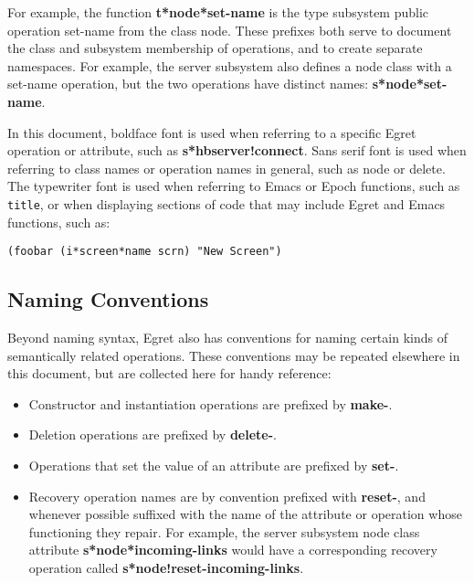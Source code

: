 For example, the function {\bf t*node*set-name} is the type subsystem
public operation {\sf set-name} from the class
{\sf node}.  These prefixes both serve to document the class and
subsystem membership of operations, and to create separate namespaces.
For example, the server subsystem also defines a node class with a
set-name operation, but the two operations have distinct names:
{\bf s*node*set-name}.

In this document, boldface font is used when referring to a specific Egret 
operation or attribute, such as {\bf s*hbserver!connect}.  Sans serif 
font is used when referring to class names or operation names in general, 
such as {\sf node} or {\sf delete}.  The typewriter font is used when
referring to Emacs or Epoch functions, such as {\tt title}, or when 
displaying sections of code that may include Egret and Emacs functions, such
as:
\small\begin{verbatim}
(foobar (i*screen*name scrn) "New Screen")
\end{verbatim}\normalsize

\subsection{Naming Conventions}

Beyond naming syntax, Egret also has conventions for naming certain
kinds of semantically related operations.  These conventions may be
repeated elsewhere in this document, but are collected here for
handy reference:

\begin{itemize}

\item Constructor and instantiation operations are prefixed by {\bf make-}.

\item Deletion operations are prefixed by {\bf delete-}.

\item Operations that set the value of an attribute are prefixed by {\bf set-}.

\item Recovery operation names are by convention prefixed with {\bf reset-},
and whenever possible suffixed with the name of the attribute or
operation whose functioning they repair.  For example, the server
subsystem node class attribute {\bf s*node*incoming-links}
would have a corresponding recovery operation called {\bf s*node!reset-incoming-links}.

\end{itemize}

